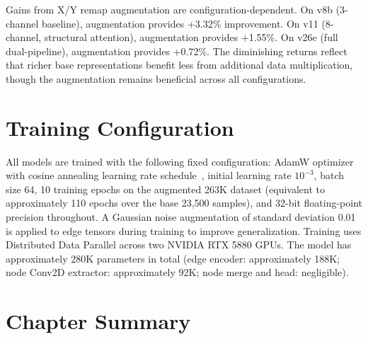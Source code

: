Gains from X/Y remap augmentation are configuration-dependent. On v8b (3-channel baseline), augmentation provides +3.32\% improvement. On v11 (8-channel, structural attention), augmentation provides +1.55\%. On v26e (full dual-pipeline), augmentation provides +0.72\%. The diminishing returns reflect that richer base representations benefit less from additional data multiplication, though the augmentation remains beneficial across all configurations.

\section{Training Configuration}
\label{sec:training_config}

All models are trained with the following fixed configuration: AdamW optimizer~\cite{loshchilov2019adamw} with cosine annealing learning rate schedule~\cite{loshchilov2017sgdr}, initial learning rate $10^{-3}$, batch size 64, 10 training epochs on the augmented 263K dataset (equivalent to approximately 110 epochs over the base 23,500 samples), and 32-bit floating-point precision throughout. A Gaussian noise augmentation of standard deviation 0.01 is applied to edge tensors during training to improve generalization. Training uses Distributed Data Parallel across two NVIDIA RTX 5880 GPUs. The model has approximately 280K parameters in total (edge encoder: approximately 188K; node Conv2D extractor: approximately 92K; node merge and head: negligible).

\section*{Chapter Summary}

